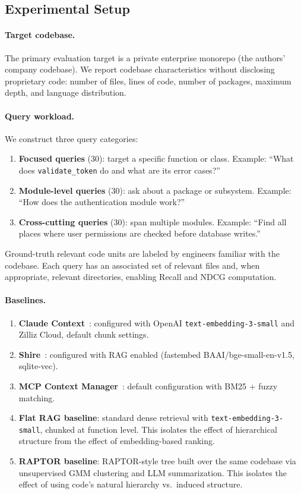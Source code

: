 \documentclass[11pt,a4paper]{article}
\begin{document}
\subsection{Experimental Setup}\label{sec:setup}

\paragraph{Target codebase.}
The primary evaluation target is a private enterprise monorepo (the authors' company codebase).
We report codebase characteristics without disclosing proprietary code: number of files, lines of code, number of packages, maximum depth, and language distribution.

\paragraph{Query workload.}
We construct three query categories:
\begin{enumerate}[nosep]
    \item \textbf{Focused queries} (30): target a specific function or class. Example: ``What does \texttt{validate\_token} do and what are its error cases?''
    \item \textbf{Module-level queries} (30): ask about a package or subsystem. Example: ``How does the authentication module work?''
    \item \textbf{Cross-cutting queries} (30): span multiple modules. Example: ``Find all places where user permissions are checked before database writes.''
\end{enumerate}
Ground-truth relevant code units are labeled by engineers familiar with the codebase.
Each query has an associated set of relevant files and, when appropriate, relevant directories, enabling Recall and NDCG computation.

\paragraph{Baselines.}
\begin{enumerate}[nosep]
    \item \textbf{Claude Context}~\cite{claudecontext}: configured with OpenAI \texttt{text-embedding-3-small} and Zilliz Cloud, default chunk settings.
    \item \textbf{Shire}~\cite{shire}: configured with RAG enabled (fastembed BAAI/bge-small-en-v1.5, sqlite-vec).
    \item \textbf{MCP Context Manager}~\cite{mcpcontext}: default configuration with BM25 + fuzzy matching.
    \item \textbf{Flat RAG baseline}: standard dense retrieval with \texttt{text-embedding-3-small}, chunked at function level. This isolates the effect of hierarchical structure from the effect of embedding-based ranking.
    \item \textbf{RAPTOR baseline}: RAPTOR-style tree built over the same codebase via unsupervised GMM clustering and LLM summarization. This isolates the effect of using code's natural hierarchy vs.\ induced structure.
\end{enumerate}
\end{document}

